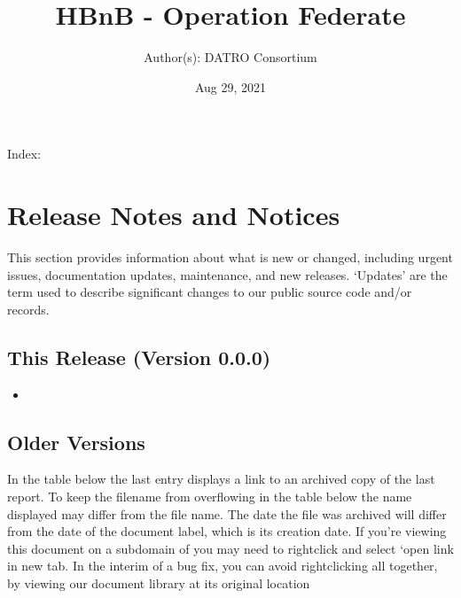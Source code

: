 \documentclass[letterpaper,10pt,openany,oneside,english]{sphinxmanual}
\title{HBnB - Operation Federate}
\date{Aug 29, 2021}
\author{Author(s): DATRO Consortium}
\begin{document}
\pagestyle{empty}
\sphinxmaketitle
\pagestyle{plain}
\sphinxtableofcontents
\pagestyle{normal}
\label{\detokenize{index::doc}}


\sphinxAtStartPar
Index:


\chapter{Release Notes and Notices}
\label{\detokenize{releasenotes:release-notes-and-notices}}\label{\detokenize{releasenotes::doc}}
\sphinxAtStartPar
This section provides information about what is new or changed, including urgent issues, documentation updates, maintenance, and new releases.
\sphinxhyphen{} ‘Updates’ are the term used to describe significant changes to our public source code and/or records.


\section{This Release (Version 0.0.0)}
\label{\detokenize{releasenotes:this-release-version-0-0-0}}\begin{itemize}
\item {} 
\sphinxAtStartPar
{} \sphinxhyphen{} 

\end{itemize}


\section{Older Versions}
\label{\detokenize{releasenotes:older-versions}}
\sphinxAtStartPar
In the table below the last entry displays a link to an archived copy of the last report.
To keep the filename from overflowing in the table below the name displayed may differ from the file name.
The date the file was archived will differ from the date of the document label, which is its creation date.
If you’re viewing this document on a subdomain of  you may need to right\sphinxhyphen{}click and select ‘open link in new tab\textasciigrave{}.
In the interim of a bug fix, you can avoid right\sphinxhyphen{}clicking all together, by viewing our document library at its original location 
\end{document}
